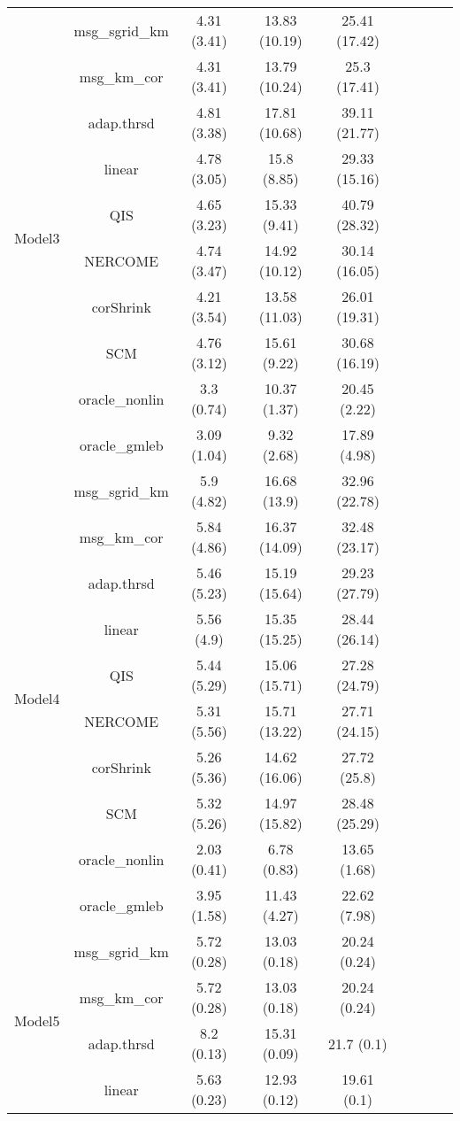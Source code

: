 \documentclass[useAMS,referee,usenatbib]{biom}
\begin{document}
\begin{table}[H]
{\begin{tabular}{ccccccccc}
\multirow{10}{*}{Model3}    
 & msg\_sgrid\_km & 4.31 (3.41) & 13.83 (10.19) & 25.41 (17.42) \\
 & msg\_km\_cor   & 4.31 (3.41) & 13.79 (10.24) & 25.3 (17.41)  \\
 & adap.thrsd     & 4.81 (3.38) & 17.81 (10.68) & 39.11 (21.77) \\
 & linear         & 4.78 (3.05) & 15.8 (8.85)   & 29.33 (15.16) \\
 & QIS            & 4.65 (3.23) & 15.33 (9.41)  & 40.79 (28.32) \\
 & NERCOME        & 4.74 (3.47) & 14.92 (10.12) & 30.14 (16.05) \\
 & corShrink      & 4.21 (3.54) & 13.58 (11.03) & 26.01 (19.31) \\
 & SCM            & 4.76 (3.12) & 15.61 (9.22)  & 30.68 (16.19) \\
 & oracle\_nonlin & 3.3 (0.74)  & 10.37 (1.37)  & 20.45 (2.22)  \\
 & oracle\_gmleb  & 3.09 (1.04) & 9.32 (2.68)   & 17.89 (4.98)  \\  \midrule
\multirow{10}{*}{Model4}    
 & msg\_sgrid\_km & 5.9 (4.82)  & 16.68 (13.9)  & 32.96 (22.78) \\
 & msg\_km\_cor   & 5.84 (4.86) & 16.37 (14.09) & 32.48 (23.17) \\
 & adap.thrsd     & 5.46 (5.23) & 15.19 (15.64) & 29.23 (27.79) \\
 & linear         & 5.56 (4.9)  & 15.35 (15.25) & 28.44 (26.14) \\
 & QIS            & 5.44 (5.29) & 15.06 (15.71) & 27.28 (24.79) \\
 & NERCOME        & 5.31 (5.56) & 15.71 (13.22) & 27.71 (24.15) \\
 & corShrink      & 5.26 (5.36) & 14.62 (16.06) & 27.72 (25.8)  \\
 & SCM            & 5.32 (5.26) & 14.97 (15.82) & 28.48 (25.29) \\
 & oracle\_nonlin & 2.03 (0.41) & 6.78 (0.83)   & 13.65 (1.68)  \\
 & oracle\_gmleb  & 3.95 (1.58) & 11.43 (4.27)  & 22.62 (7.98) \\ \midrule
\multirow{10}{*}{Model5}  
 & msg\_sgrid\_km & 5.72 (0.28) & 13.03 (0.18) & 20.24 (0.24) \\
 & msg\_km\_cor   & 5.72 (0.28) & 13.03 (0.18) & 20.24 (0.24) \\
 & adap.thrsd     & 8.2 (0.13)  & 15.31 (0.09) & 21.7 (0.1)   \\
 & linear         & 5.63 (0.23) & 12.93 (0.12) & 19.61 (0.1)  \\

\end{tabular}}
\end{table}
\end{document}
